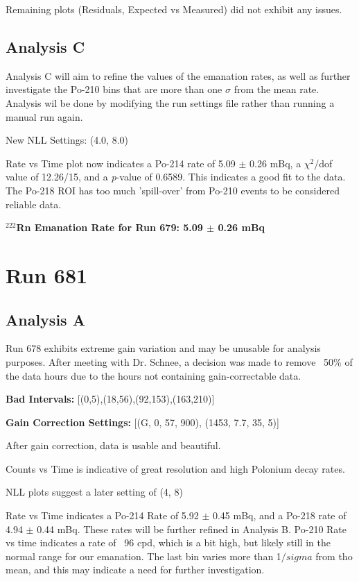 \documentclass[letterpaper, 12pt]{article}
\begin{document}
Remaining plots (Residuals, Expected vs Measured) did not exhibit any issues.

\subsection{Analysis C}
Analysis C will aim to refine the values of the emanation rates, as well as 
further investigate the Po-210 bins that are more than one $\sigma$ from the 
mean rate. Analysis wil be done by modifying the run settings file rather than
running a manual run again.

New NLL Settings: (4.0, 8.0)

Rate vs Time plot now indicates a Po-214 rate of 5.09 $\pm$ 0.26 mBq, a 
$\chi$$^{2}$/dof value of 12.26/15, and a \textit{p}-value of 0.6589. This
indicates a good fit to the data. The Po-218 ROI has too much 'spill-over' from
Po-210 events to be considered reliable data.
\newline

\begin{center}
\textbf{$^{222}$Rn Emanation Rate for Run 679: 5.09 $\pm$ 0.26 mBq}
\end{center}

\section{Run 681}
\subsection{Analysis A}
Run 678 exhibits extreme gain variation and may be unusable for analysis purposes.
After meeting with Dr. Schnee, a decision was made to remove ~50\% of the data 
hours due to the hours not containing gain-correctable data.


\textbf{Bad Intervals:}
[(0,5),(18,56),(92,153),(163,210)]

\textbf{Gain Correction Settings:}
[(G, 0, 57, 900), (1453, 7.7, 35, 5)]

After gain correction, data is usable and beautiful.

Counts vs Time is indicative of great resolution and high Polonium decay rates.

NLL plots suggest a later setting of (4, 8)

Rate vs Time indicates a Po-214 Rate of 5.92 $\pm$ 0.45 mBq, and a Po-218 rate 
of 4.94 $\pm$ 0.44 mBq. These rates will be further refined in Analysis B. 
Po-210 Rate vs time indicates a rate of ~96 cpd, which is a bit high, but likely
still in the normal range for our emanation. The last bin varies more than 1$/sigma$
from tho mean, and this may indicate a need for further investigation.
\end{document}
